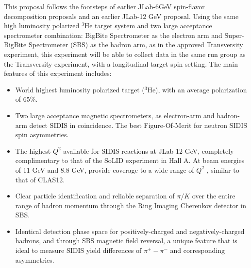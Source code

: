 This proposal follows the footsteps of earlier JLab-6GeV spin-flavor decomposition proposals 
and an earlier JLab-12 GeV proposal.
Using the same high luminosity polarized $^3$He target system and two large acceptance spectrometer combination: BigBite Spectrometer as the electron arm and Super-BigBite Spectrometer (SBS) as the hadron arm,  as in the approved Transversity experiment,  this experiment will be able to collect data in the same run group as the Transversity experiment,  with a longitudinal target spin setting.  The main features of this experiment includes:

\begin{itemize}
\item {World highest luminosity polarized  target ($^3$He), with an average polarization of 65$\%$.  }
\item {Two large acceptance magnetic spectrometers, as electron-arm and hadron-arm detect SIDIS in coincidence. The best Figure-Of-Merit for neutron SIDIS spin asymmetries.}
\item{The highest $Q^2$ available for SIDIS reactions at  JLab-12 GeV,  completely complimentary to that of the  SoLID experiment in  Hall A.  At beam energies  of 11 GeV and 8.8 GeV,  provide coverage to a wide range of $Q^2$ , similar to that of CLAS12. }
 \item{Clear particle identification and reliable separation of $\pi/K$ over the entire range of hadron momentum through the Ring Imaging Cherenkov detector in SBS.}
  \item{Identical detection phase space for positively-charged  and negatively-charged hadrons, and through SBS magnetic field reversal, a unique feature that is ideal to measure SIDIS yield differences of $\pi^+ -\pi^-$ and corresponding asymmetries.}  
\end{itemize}

